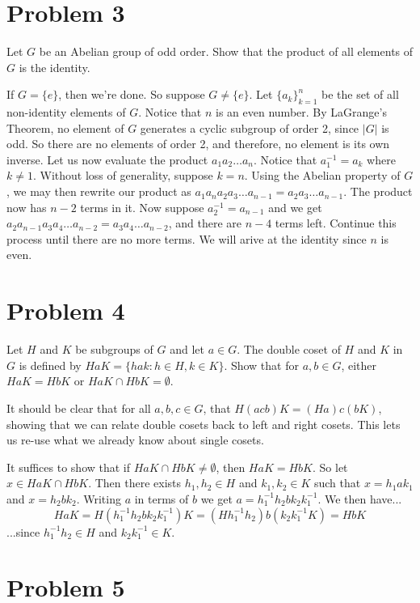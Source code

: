 \documentclass{article}
\begin{document}
\section*{Problem 3}

Let $G$ be an Abelian group of odd order.  Show that the product of all
elements of $G$ is the identity.

If $G=\{e\}$, then we're done.  So suppose $G\neq\{e\}$.
Let $\{a_k\}_{k=1}^n$ be the set of all non-identity elements of $G$.
Notice that $n$ is an even number.
By LaGrange's Theorem, no element of $G$ generates a cyclic subgroup
of order 2, since $|G|$ is odd.  So there are no elements of order 2, and therefore,
no element is its own inverse.  Let us now evaluate the product
$a_1a_2\dots a_n$.  Notice that $a_1^{-1}=a_k$ where $k\neq 1$.
Without loss of generality, suppose $k=n$.  Using the Abelian property of $G$,
we may then rewrite
our product as $a_1a_na_2a_3\dots a_{n-1}=a_2a_3\dots a_{n-1}$.
The product now has $n-2$ terms in it.  Now suppose $a_2^{-1}=a_{n-1}$
and we get $a_2a_{n-1}a_3a_4\dots a_{n-2}=a_3a_4\dots a_{n-2}$, and
there are $n-4$ terms left.  Continue this process until there are
no more terms.  We will arive at the identity since $n$ is even.

\section*{Problem 4}

Let $H$ and $K$ be subgroups of $G$ and let $a\in G$.
The double coset of $H$ and $K$ in $G$ is defined by
$HaK=\{hak:h\in H,k\in K\}$.  Show that for $a,b\in G$,
either $HaK=HbK$ or $HaK\cap HbK=\emptyset$.

It should be clear
that for all $a,b,c\in G$, that $H(acb)K=(Ha)c(bK)$, showing that
we can relate double cosets back to left and right cosets.
This lets us re-use what we already know about single cosets.

It suffices to show that if $HaK\cap HbK\neq\emptyset$, then
$HaK=HbK$.  So let $x\in HaK\cap HbK$.  Then there exists
$h_1,h_2\in H$ and $k_1,k_2\in K$ such that $x=h_1ak_1$
and $x=h_2bk_2$.  Writing $a$ in terms of $b$ we get
$a=h_1^{-1}h_2bk_2k_1^{-1}$.  We then have...
\begin{equation*}
HaK=H(h_1^{-1}h_2bk_2k_1^{-1})K=(Hh_1^{-1}h_2)b(k_2k_1^{-1}K)=HbK
\end{equation*}
...since $h_1^{-1}h_2\in H$ and $k_2k_1^{-1}\in K$.

\section*{Problem 5}
\end{document}

